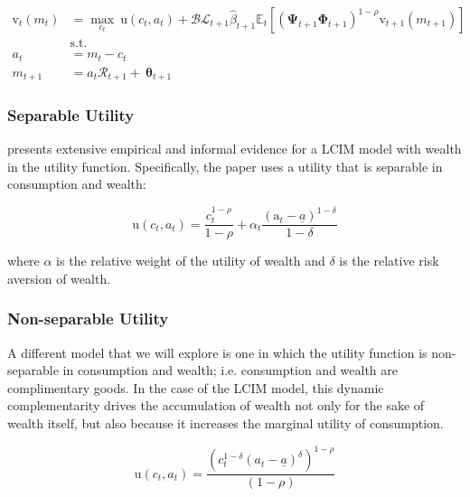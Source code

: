\documentclass{article}
\newcommand{\DiscFac}{\beta}
\newcommand{\uFunc}{\mathrm{u}}
\newcommand{\vFunc}{\mathrm{v}}
\newcommand{\Alive}{\mathcal{L}}
\newcommand{\Ex}{\mathbb{E}}
\newcommand{\beth}{\mathcal{B}}
\newcommand{\CRRA}{\rho}
\newcommand{\PermGroFac}{\pmb{\Phi}}
\newcommand{\PermShk}{\mathbf{\Psi}}
\newcommand{\aNrm}{a}
\newcommand{\cNrm}{c}
\newcommand{\RNrm}{\mathcal{R}}
\newcommand{\TranShkEmp}{\pmb{\theta}}
\newcommand{\aFunc}{\mathrm{a}}
\newcommand{\kapShare}{\alpha}
\newcommand{\wealthShare}{\delta}
\begin{document}
\begin{equation}
\begin{align}
    {\vFunc}_{t}({m}_{t}) & = \max_{\cNrm_{t}} ~ \uFunc(\cNrm_{t}, \aNrm_{t})+\beth\Alive_{t+1}\hat{\DiscFac}_{t+1}
    \Ex_{t}[(\PermShk_{t+1}\PermGroFac_{t+1})^{1-\CRRA}{\vFunc}_{t+1}({m}_{t+1})]
    \\ & \text{s.t.} & \nonumber
    \\ \aNrm_{t} & = {m}_{t}-\cNrm_{t} \nonumber
    \\ {m}_{t+1} & = \aNrm_{t}\RNrm_{t+1}+ ~\TranShkEmp_{t+1}
\end{align}
\end{equation}

\subsubsection{Separable Utility}\label{Separable Utility}

\cite{Carroll_1998} presents extensive empirical and informal evidence for a LCIM model with wealth in the utility function. Specifically, the paper uses a utility that is separable in consumption and wealth:

\begin{equation}
\uFunc(\cNrm_{t}, \aNrm_{t}) = \frac{\cNrm_{t}^{1-\CRRA}}{1-\CRRA}
    + \kapShare_{t} \frac{(\aFunc_{t} - \underline\aNrm)^{1-\wealthShare}}{1-\wealthShare}
\end{equation}

where $\kapShare$ is the relative weight of the utility of wealth and $\wealthShare$ is the relative risk aversion of wealth.

\subsubsection{Non-separable Utility}\label{Non-separable Utility}

A different model that we will explore is one in which the utility function is non-separable in consumption and wealth; i.e. consumption and wealth are complimentary goods. In the case of the LCIM model, this dynamic complementarity drives the accumulation of wealth not only for the sake of wealth itself, but also because it increases the marginal utility of consumption.

\begin{equation}
\uFunc(\cNrm_{t}, \aNrm_{t}) = \frac{(\cNrm_{t}^{1-\wealthShare} (\aNrm_{t} - \underline\aNrm)^\wealthShare)^{1-\CRRA}}{(1-\CRRA)}
\end{equation}
\end{document}
